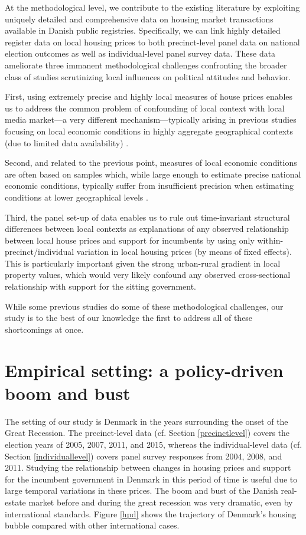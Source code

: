 \documentclass[12pt,a4paper]{article}
\begin{document}
At the methodological level, we contribute to the existing literature by exploiting uniquely detailed and comprehensive data on housing market transactions available in Danish public registries. Specifically, we can link highly detailed register data on local housing prices to both precinct-level panel data on national election outcomes as well as individual-level panel survey data. These data ameliorate three immanent methodological challenges confronting the broader class of studies scrutinizing local influences on political attitudes and behavior.

First, using extremely precise and highly local measures of house prices enables us to address the common problem of confounding of local context with local media market—a very different mechanism—typically arising in previous studies focusing on local economic conditions in highly aggregate geographical contexts (due to limited data availability) \citep[][]{bisgaard2016reconsidering}.  

Second, and related to the previous point,  measures of local economic conditions are often based on samples which, while large enough to estimate precise national economic conditions, typically suffer from insufficient precision when estimating conditions at lower geographical levels \citep[][]{healy2014presidential}. 

Third, the panel set-up of data enables us to rule out time-invariant structural differences between local contexts as explanations of any observed relationship between local house prices and support for incumbents by using only within-precinct/individual variation in local housing prices (by means of fixed effects). This is particularly important given the strong urban-rural gradient in local property values, which would very likely confound any observed cross-sectional relationship with support for the sitting government. 

While some previous studies do  some of these methodological challenges, our study is to the best of our knowledge the first to address all of these shortcomings at once. 



\section{Empirical setting: a policy-driven boom and bust}

The setting of our study is Denmark in the years surrounding the onset of the Great Recession. The precinct-level data (cf. Section \ref{precinctlevel}) covers the election years of 2005, 2007, 2011, and 2015, whereas the individual-level data (cf. Section \ref{individuallevel}) covers panel survey responses from 2004, 2008, and 2011. Studying the relationship between changes in housing prices and support for the incumbent government in Denmark in this period of time is useful due to large temporal variations in these prices. The boom and bust of the Danish real-estate market before and during the great recession was very dramatic, even by international standards. Figure \ref{hpd} shows the trajectory of Denmark's housing bubble compared with other international cases.
\end{document}
